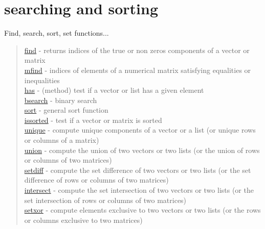 \chapter*{searching and sorting}
\hypertarget{searchandsort}{}
Find, search, sort, set functions...

\begin{quote}
\noindent
\hyperlink{find}{find} - returns indices of the true or non zeros
components of a vector or matrix \\
\hyperlink{mfind}{mfind} - indices of elements of a numerical matrix satisfying equalities or inequalities\\
\hyperlink{has}{has} - (method) test if a vector or list has a given element\\
\hyperlink{bsearch}{bsearch} - binary search \\
\hyperlink{sort}{sort} - general sort function \\
\hyperlink{issorted}{issorted} - test if a vector or matrix is sorted \\
\hyperlink{unique}{unique} - compute unique components of a vector or a list (or unique rows or columns of a matrix) \\
\hyperlink{union}{union} - compute the union of two vectors or two lists (or the union of rows or columns of two matrices) \\
\hyperlink{setdiff}{setdiff} - compute the set difference of two vectors or two lists (or the set difference of rows or columns of two matrices) \\
\hyperlink{intersect}{intersect} - compute the set intersection of two vectors or two lists  (or the set intersection of rows or columns of two matrices)\\
\hyperlink{setxor}{setxor} - compute elements exclusive to two vectors or two lists (or the rows or columns exclusive to two matrices)\\
\end{quote}












